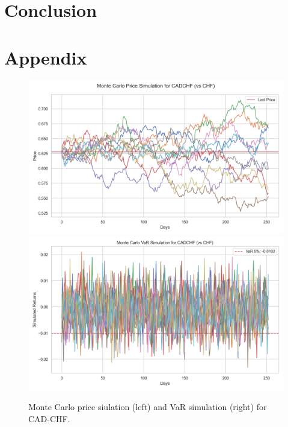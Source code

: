 \documentclass{article}
\begin{document}
\section{Conclusion}
\section*{Appendix}

\begin{figure}[h]
    \centering  \includegraphics[width=0.48\linewidth]{reports/figures/monte_carlo_price_simulation_CADCHF_vs_CHF.png} \label{fig:monte_carlo_price_simulation_CADCHF_vs_CHF}
    \includegraphics[width=0.48\linewidth]{reports/figures/monte_carlo_var_simulation_CADCHF_vs_CHF.png} \label{fig:monte_carlo_var_simulation_CADCHF_vs_CHF}
    \caption{\footnotesize Monte Carlo price siulation (left) and VaR simulation (right) for CAD-CHF.}
\end{figure}
\printbibliography
\end{document}
